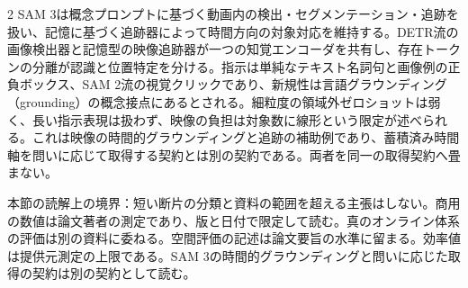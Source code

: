 \documentclass[lualatex,a4paper,10pt]{jlreq}
\begin{document}
\begin{multicols}{2}
\noindent SAM 3は概念プロンプトに基づく動画内の検出・セグメンテーション・追跡を扱い、記憶に基づく追跡器によって時間方向の対象対応を維持する。DETR流の画像検出器と記憶型の映像追跡器が一つの知覚エンコーダを共有し、存在トークンの分離が認識と位置特定を分ける。指示は単純なテキスト名詞句と画像例の正負ボックス、SAM 2流の視覚クリックであり、新規性は言語グラウンディング（grounding）の概念接点にあるとされる。細粒度の領域外ゼロショットは弱く、長い指示表現は扱わず、映像の負担は対象数に線形という限定が述べられる。これは映像の時間的グラウンディングと追跡の補助例であり、蓄積済み時間軸を問いに応じて取得する契約とは別の契約である。両者を同一の取得契約へ畳まない。\autocite{vmd115}\par\medskip
\end{multicols}
\begin{claimboundary}[本節の読解上の境界]
\noindent 本節の読解上の境界：短い断片の分類と資料の範囲を超える主張はしない。商用の数値は論文著者の測定であり、版と日付で限定して読む。真のオンライン体系の評価は別の資料に委ねる。空間評価の記述は論文要旨の水準に留まる。効率値は提供元測定の上限である。SAM 3の時間的グラウンディングと問いに応じた取得の契約は別の契約として読む。\autocite{vmd085,vmd088,vmd089,vmd083,vmd084,vmd086,vmd087,vmd111,vmd112}\par
\end{claimboundary}

\Needspace{0.20\textheight}
\end{document}
